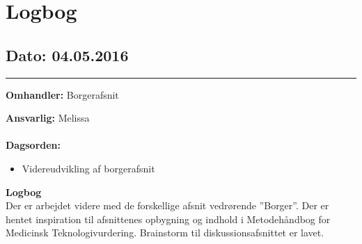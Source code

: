 \chapter{Logbog}

\section{Dato: 04.05.2016}
\hrule

\textbf{Omhandler:} Borgerafsnit

\textbf{Ansvarlig:} Melissa \\ \\
\textbf{Dagsorden:}
\begin{itemize}
	\item Videreudvikling af borgerafsnit
\end{itemize}

\textbf{Logbog}
\\
Der er arbejdet videre med de forskellige afsnit vedrørende ”Borger”. Der er hentet inspiration til afsnittenes opbygning og indhold i Metodehåndbog for Medicinsk Teknologivurdering. Brainstorm til diskussionsafsnittet er lavet. 
\\ \\



